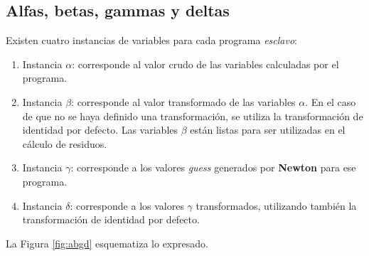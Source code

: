 \subsection*{Alfas, betas, gammas y deltas}
\label{ap1:abgd}

Existen cuatro instancias de variables para cada programa \textit{esclavo}:
\begin{enumerate}
\item Instancia $\alpha$: corresponde al valor crudo de las variables calculadas por el programa.
\item Instancia $\beta$: corresponde al valor transformado de las variables $\alpha$.
En el caso de que no se haya definido una transformación, se utiliza la transformación de identidad por defecto.
Las variables $\beta$ están listas para ser utilizadas en el cálculo de residuos.
\item Instancia $\gamma$: corresponde a los valores \textit{guess} generados por \textbf{Newton} para ese programa.
\item Instancia $\delta$: corresponde a los valores $\gamma$ transformados, utilizando también la transformación de identidad por defecto.
\end{enumerate}
La Figura \ref{fig:abgd} esquematiza lo expresado.



